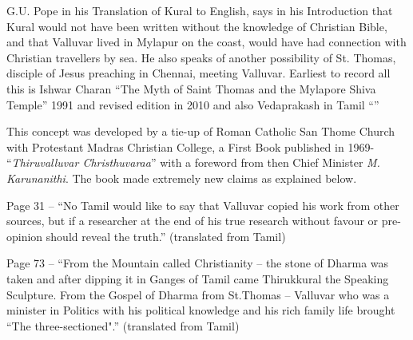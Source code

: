 G.U. Pope in his Translation of Kural to English, says in his Introduction that Kural would not have been written without the knowledge of Christian Bible, and that Valluvar lived in Mylapur on the coast, would have had connection with Christian travellers by sea. He also speaks of another possibility of St. Thomas, disciple of Jesus preaching in Chennai, meeting Valluvar. Earliest to record all this is Ishwar Charan “The Myth of Saint Thomas and the Mylapore Shiva Temple” 1991 and revised edition in 2010 and also Vedaprakash in Tamil “”

This concept was developed by a tie-up of Roman Catholic San Thome Church  with Protestant Madras Christian College, a First Book published in 1969- “\textit{Thiruvalluvar Christhuvaraa}” with a foreword from then Chief Minister \textit{M. Karunanithi}. The book made extremely new claims as explained below.

Page 31 -- “No Tamil would like to say that Valluvar copied his work from other sources, but if a researcher at the end of his true research without favour or pre-opinion should reveal the truth.” (translated from Tamil) 

Page 73 -- “From the Mountain called Christianity – the stone of Dharma was taken and after dipping it in Ganges of Tamil came Thirukkural the Speaking Sculpture. From the Gospel of Dharma from St.Thomas – Valluvar who was a minister in Politics with his political knowledge and his rich family life brought “The three-sectioned".” (translated from Tamil)

